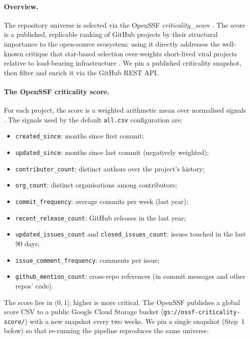 
\paragraph{Overview.} The repository universe is selected via the OpenSSF
\emph{criticality\_score} \citep{ossf-criticality}.
The score is a published, replicable
ranking of GitHub projects by their structural importance to the open-source
ecosystem; using it directly addresses the well-known critique that
star-based selection over-weights short-lived viral projects relative to
load-bearing infrastructure
\citep{borges2018github, kalliamvakou2014promises, munaiah2017curating}.
We pin a published criticality snapshot, then filter and enrich it via the
GitHub REST API.

\paragraph{The OpenSSF criticality score.} For each project, the score is a
weighted arithmetic mean over normalised signals
\citep{ossf-criticality}. The signals used by the default \texttt{all.csv}
configuration are:
\begin{itemize}
\item \texttt{created\_since}: months since first commit;
\item \texttt{updated\_since}: months since last commit (negatively weighted);
\item \texttt{contributor\_count}: distinct authors over the project's history;
\item \texttt{org\_count}: distinct organisations among contributors;
\item \texttt{commit\_frequency}: average commits per week (last year);
\item \texttt{recent\_release\_count}: GitHub releases in the last year;
\item \texttt{updated\_issues\_count} and \texttt{closed\_issues\_count}: issues touched in the last 90 days;
\item \texttt{issue\_comment\_frequency}: comments per issue;
\item \texttt{github\_mention\_count}: cross-repo references (in commit messages and other repos' code).
\end{itemize}
The score lies in $(0, 1]$; higher is more critical. The OpenSSF
publishes a global score CSV to a public Google Cloud Storage bucket
(\texttt{gs://ossf-criticality-score/}) with a new snapshot every two
weeks. We pin a single snapshot (Step~1 below) so that re-running the
pipeline reproduces the same universe.

